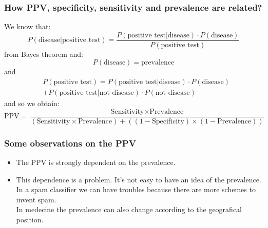 \documentclass[9pt]{beamer}
\begin{document}
\begin{frame}
\frametitle{How PPV, specificity, sensitivity and prevalence are related?}
We know that:
$$
P(\mbox{disease}| \mbox{positive test}) = \dfrac{P(\mbox{positive test} | \mbox{disease}) \cdot P(\mbox{disease})}{P(\mbox{positive test})}
$$
from Bayes theorem and:
$$
P(\mbox{disease}) = \mbox{prevalence}
$$
and 
\begin{align}
& P(\mbox{positive test}) = P(\mbox{positive test} | \mbox{disease})\cdot P(\mbox{disease})\\
&+ P(\mbox{positive test} | \mbox{not disease}) \cdot P(\mbox{not disease}) 
\end{align}
and so we obtain:
$$
\mbox{PPV}= \dfrac{\mbox{Sensitivity}\times \mbox{Prevalence}}{(\mbox{Sensitivity}\times \mbox{Prevalence}) + ((1-\mbox{Specificity})\times (1-\mbox{Prevalence}))}
$$
\end{frame}

\begin{frame}
\frametitle{Some observations on the PPV}
\begin{itemize}
\item The PPV is strongly dependent on the prevalence.
\item This dependence is a problem. It's not easy to have an idea of the prevalence.\\ In a spam classifier we can have troubles because there are more schemes to invent spam.\\
In medecine the prevalence can also change according to the geografical position.\\
\end{itemize}
\end{frame}
\end{document}
